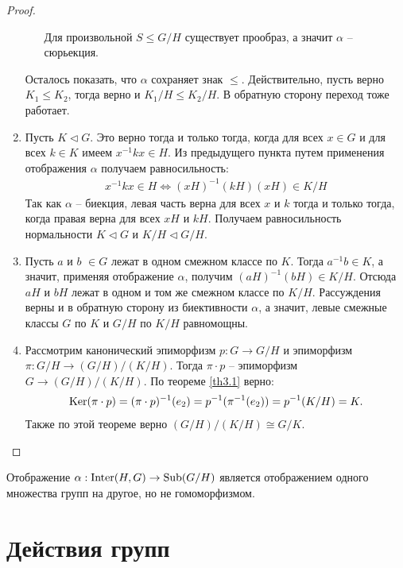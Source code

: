 \begin{proof}
\begin{enumerate}
\begin{enumerate}
            Для произвольной $S \leq G/H$ существует прообраз, а значит $\alpha$ -- сюрьекция.
        \end{enumerate}
        Осталось показать, что $\alpha$ сохраняет знак $\leq$. Действительно, пусть верно $K_1 \leq K_2$, 
        тогда верно и $K_1/H \leq K_2/H$. В обратную сторону переход тоже работает.
        \item Пусть $K \vartriangleleft G$. Это верно тогда и только тогда, когда для всех 
        $x \in G$ и для всех $k \in K$ имеем $x^{-1}kx \in H$. Из предыдущего пункта путем применения 
        отображения $\alpha$ получаем равносильность:
        \begin{gather*}
            x^{-1}kx \in H \Leftrightarrow (xH)^{-1}(kH)(xH) \in K/H
        \end{gather*}
        Так как $\alpha$ -- биекция, левая часть верна для всех $x$ и $k$ тогда и только тогда,
        когда правая верна для всех $xH$ и $kH$. Получаем равносильность нормальности 
        $K \vartriangleleft G$ и $K/H \vartriangleleft G/H$.
        \item Пусть $a$ и $b$ $\in G$ лежат в одном смежном классе по $K$. Тогда $a^{-1}b \in K$, 
        а значит, применяя отображение $\alpha$, получим $(aH)^{-1}(bH) \in K/H$. Отсюда $aH$ и $bH$ лежат в одном и том же смежном 
        классе по $K/H$. Рассуждения верны и в обратную сторону из биективности $\alpha$, а значит, 
        левые смежные классы $G$ по $K$ и $G/H$ по $K/H$ равномощны.
        \item Рассмотрим канонический эпиморфизм $p: G \to G/H$ и эпиморфизм $\pi: G/H \to (G/H)/(K/H)$.
        Тогда $\pi \cdot p$ -- эпиморфизм $G \to (G/H)/(K/H)$.
        По теореме \ref{th3.1} верно: 
        \begin{gather*}
            \operatorname{Ker} (\pi \cdot p) = (\pi \cdot p)^{-1}(e_2) = p^{-1}(\pi^{-1}(e_2)) = p^{-1}(K/H) = K.
        \end{gather*}
        Также по этой теореме верно $(G/H)/(K/H) \cong G/K$.
    \end{enumerate}
\end{proof}

\begin{note}
    Отображение $\alpha: \operatorname{\text{Inter}}(H, G) \to \text{Sub}(G/H)$ является отображением одного множества 
    групп на другое, но не гомоморфизмом.
\end{note}

\section{Действия групп}
